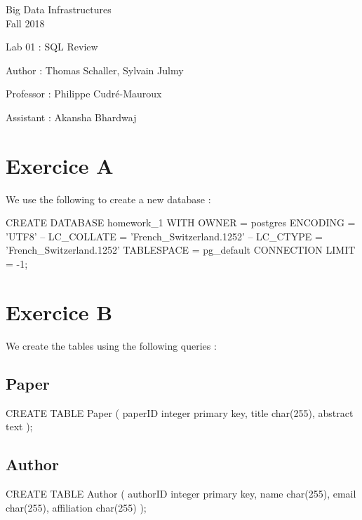 \documentclass[a4paper,11pt]{report}
\date{\today}
\begin{document}
\begin{center}
\Large{
    Big Data Infrastructures\\
    Fall 2018
  }
  
  \noindent\makebox[\linewidth]{\rule{\linewidth}{0.4pt}}
  Lab 01 : SQL Review

  \vspace*{1.4cm}

  Author : Thomas Schaller, Sylvain Julmy
  \noindent\makebox[\linewidth]{\rule{\linewidth}{0.4pt}}

  \begin{flushleft}
    Professor : Philippe Cudré-Mauroux
    
    Assistant : Akansha Bhardwaj
  \end{flushleft}

  \noindent\makebox[\linewidth]{\rule{\textwidth}{1pt}}
\end{center}

\section*{Exercice A}

We use the following to create a new database :
\begin{sqlcode}
  CREATE DATABASE homework_1
  WITH
  OWNER = postgres
  ENCODING = 'UTF8'
  -- LC_COLLATE = 'French_Switzerland.1252'
  -- LC_CTYPE = 'French_Switzerland.1252'
  TABLESPACE = pg_default
  CONNECTION LIMIT = -1;
\end{sqlcode}

\section*{Exercice B}

We create the tables using the following queries :

\subsection*{Paper}
\begin{sqlcode}
  CREATE TABLE Paper (
    paperID  integer primary key,
    title    char(255),
    abstract text
  );
\end{sqlcode}

\subsection*{Author}
\begin{sqlcode}
  CREATE TABLE Author (
    authorID    integer primary key,
    name        char(255),
    email       char(255),
    affiliation char(255)
  );
\end{sqlcode}
\end{document}
